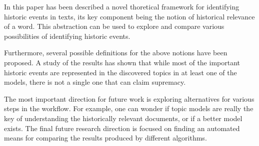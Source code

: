
In this paper has been described a novel thoretical framework for identifying historic events in texts, its key component being the notion of historical relevance of a word. This abstraction can be used to explore and compare various possibilities of identifying historic events.

Furthermore, several possible definitions for the above notions have been proposed. A study of the results has shown that while most of the important historic events are represented in the discovered topics in at least one of the models, there is not a single one that can claim supremacy.

The most important direction for future work is exploring alternatives for various steps in the workflow. For example, one can wonder if topic models are really the key of understanding the historically relevant documents, or if a better model exists. The final future research direction is focused on finding an automated means for comparing the results produced by different algorithms.
